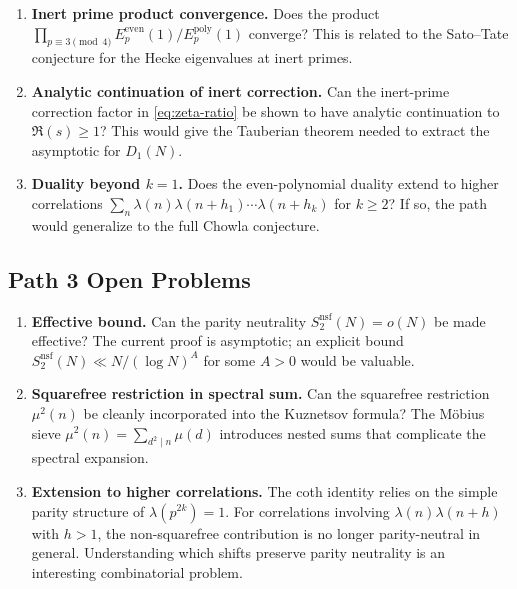 \documentclass[11pt,a4paper]{article}
\theoremstyle{plain}
\theoremstyle{definition}
\begin{document}
\begin{enumerate}[label=\textbf{OP2.\arabic*:}]
\item \textbf{Inert prime product convergence.} Does the product $\prod_{p \equiv 3 \pmod{4}} E_p^{\mathrm{even}}(1)/E_p^{\mathrm{poly}}(1)$ converge? This is related to the Sato--Tate conjecture for the Hecke eigenvalues at inert primes.

\item \textbf{Analytic continuation of inert correction.} Can the inert-prime correction factor in \eqref{eq:zeta-ratio} be shown to have analytic continuation to $\Re(s) \geq 1$? This would give the Tauberian theorem needed to extract the asymptotic for $D_1(N)$.

\item \textbf{Duality beyond $k=1$.} Does the even-polynomial duality extend to higher correlations $\sum_n \lambda(n)\lambda(n+h_1)\cdots\lambda(n+h_k)$ for $k \geq 2$? If so, the path would generalize to the full Chowla conjecture.
\end{enumerate}

\subsection{Path 3 Open Problems}

\begin{enumerate}[label=\textbf{OP3.\arabic*:}]
\item \textbf{Effective bound.} Can the parity neutrality $S_2^{\mathrm{nsf}}(N) = o(N)$ be made effective? The current proof is asymptotic; an explicit bound $S_2^{\mathrm{nsf}}(N) \ll N / (\log N)^A$ for some $A > 0$ would be valuable.

\item \textbf{Squarefree restriction in spectral sum.} Can the squarefree restriction $\mu^2(n)$ be cleanly incorporated into the Kuznetsov formula? The M\"obius sieve $\mu^2(n) = \sum_{d^2 \mid n} \mu(d)$ introduces nested sums that complicate the spectral expansion.

\item \textbf{Extension to higher correlations.} The coth identity relies on the simple parity structure of $\lambda(p^{2k}) = 1$. For correlations involving $\lambda(n)\lambda(n+h)$ with $h > 1$, the non-squarefree contribution is no longer parity-neutral in general. Understanding which shifts preserve parity neutrality is an interesting combinatorial problem.
\end{enumerate}
\end{document}
